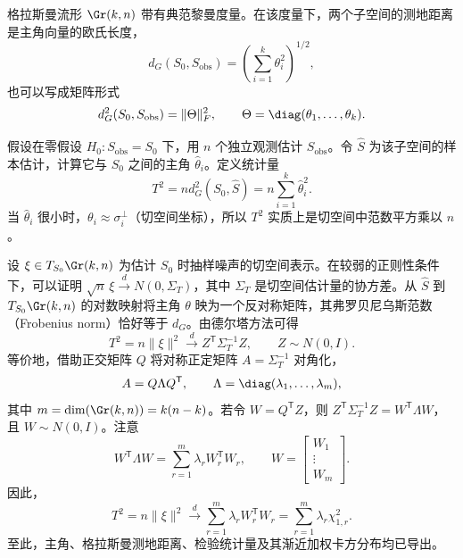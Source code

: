 
格拉斯曼流形 $\Gr(k,n)$ 带有典范黎曼度量。在该度量下，两个子空间的测地距离是主角向量的欧氏长度，
\[
  d_G(S_0,S_{\mathrm{obs}})=\left(\sum_{i=1}^k\theta_i^2\right)^{1/2},
\]
也可以写成矩阵形式
\[
  d_G^2(S_0,S_{\mathrm{obs}})=\lVert\Theta\rVert_F^2,\qquad
  \Theta=\diag(\theta_1,\ldots,\theta_k).
\]


假设在零假设 $H_0:S_{\mathrm{obs}}=S_0$ 下，用 $n$ 个独立观测估计 $S_{\mathrm{obs}}$。令 $\hat S$ 为该子空间的样本估计，计算它与 $S_0$ 之间的主角 $\hat\theta_i$。定义统计量
\begin{equation*}
  T^2=nd_G^2(S_0,\hat S)=n\sum_{i=1}^k\hat\theta_i^2.
  \tag{6I1}\label{eq:6I1}
\end{equation*}
当 $\hat\theta_i$ 很小时，$\theta_i\approx\sigma_i^\perp$（切空间坐标），所以 $T^2$ 实质上是切空间中范数平方乘以 $n$。


设 $\xi\in T_{S_0}\Gr(k,n)$ 为估计 $S_0$ 时抽样噪声的切空间表示。在较弱的正则性条件下，可以证明 $\sqrt n\,\xi\xrightarrow{d}N(0,\Sigma_T)$，其中 $\Sigma_T$ 是切空间估计量的协方差。从 $\hat S$ 到 $T_{S_0}\Gr(k,n)$ 的对数映射将主角 $\theta$ 映为一个反对称矩阵，其弗罗贝尼乌斯范数（Frobenius norm）恰好等于 $d_G$。由德尔塔方法可得
\[
  T^2=n\lVert\xi\rVert^2\xrightarrow{d}Z^{\mathsf T}\Sigma_T^{-1}Z,
   \qquad Z\sim N(0,I).
\]
等价地，借助正交矩阵 $Q$ 将对称正定矩阵 $A=\Sigma_T^{-1}$ 对角化，
\[
  A=Q\Lambda Q^{\mathsf T},\qquad
  \Lambda=\diag(\lambda_1,\ldots,\lambda_m),
\]
其中 $m=\dim(\Gr(k,n))=k(n-k)$。若令 $W=Q^{\mathsf T}Z$，则
$Z^{\mathsf T}\Sigma_T^{-1}Z=W^{\mathsf T}\Lambda W$，且 $W\sim N(0,I)$。注意
\[
  W^{\mathsf T}\Lambda W=\sum_{r=1}^m\lambda_r W_r^{\mathsf T}W_r,
  \qquad W=\begin{bmatrix}W_1\\\vdots\\W_m\end{bmatrix}.
\]
因此，
\[
  T^2=n\lVert\xi\rVert^2\xrightarrow{d}
  \sum_{r=1}^m\lambda_r W_r^{\mathsf T}W_r=\sum_{r=1}^m\lambda_r\chi_{1,r}^2.
\]
至此，主角、格拉斯曼测地距离、检验统计量及其渐近加权卡方分布均已导出。
